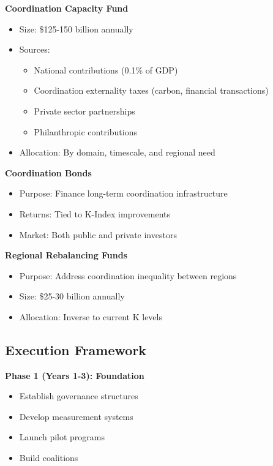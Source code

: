 \documentclass[12pt,letterpaper]{article}
\begin{document}
\textbf{Coordination Capacity Fund}
\begin{itemize}
    \item Size: \$125-150 billion annually
    \item Sources:
        \begin{itemize}
            \item National contributions (0.1\% of GDP)
            \item Coordination externality taxes (carbon, financial transactions)
            \item Private sector partnerships
            \item Philanthropic contributions
        \end{itemize}
    \item Allocation: By domain, timescale, and regional need
\end{itemize}

\textbf{Coordination Bonds}
\begin{itemize}
    \item Purpose: Finance long-term coordination infrastructure
    \item Returns: Tied to K-Index improvements
    \item Market: Both public and private investors
\end{itemize}

\textbf{Regional Rebalancing Funds}
\begin{itemize}
    \item Purpose: Address coordination inequality between regions
    \item Size: \$25-30 billion annually
    \item Allocation: Inverse to current K levels
\end{itemize}

\subsection{Execution Framework}

\textbf{Phase 1 (Years 1-3): Foundation}
\begin{itemize}
    \item Establish governance structures
    \item Develop measurement systems
    \item Launch pilot programs
    \item Build coalitions
\end{itemize}
\end{document}
